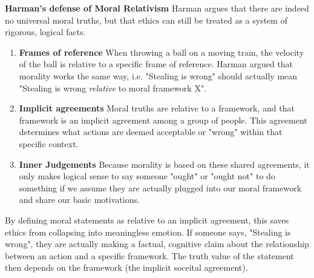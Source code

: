 \documentclass[12pt]{article}
\begin{document}
\noindent\textbf{Harman's defense of Moral Relativism} 
Harman argues that there are indeed no universal moral truths, 
but that ethics can still be treated as a system of rigorous, logical facts.
\begin{enumerate}
    \item \textbf{Frames of reference} When throwing a ball on a moving train, the velocity of the ball is relative to a specific frame of reference.
    Harman argued that morality works the same way, i.e. "Stealing is wrong" should actually mean "Stealing is wrong \textit{relative} to moral framework X".
    \item \textbf{Implicit agreements} Moral truths are relative to a framework, and that framework is an implicit agreement among a group of people.
    This agreement determines what actions are deemed acceptable or "wrong" within that specific context.
    \item \textbf{Inner Judgements} Because morality is based on these shared agreements,
    it only makes logical sense to say someone "ought" or "ought not" to do something if we assume they are actually plugged into our moral framework and share our basic motivations.
\end{enumerate}
By defining moral statements as relative to an implicit agreement, this saves ethics from collapsing into meaningless emotion.
If someone says, "Stealing is wrong", they are actually making a factual, cognitive claim about the relationship between an action and a specific framework.
The truth value of the statement then depends on the framework (the implicit soceital agreement).
\end{document}
